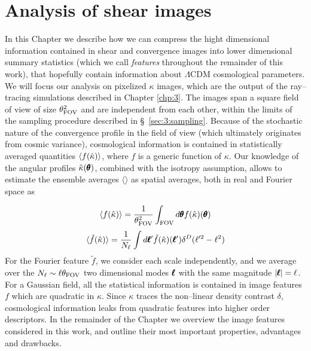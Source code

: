 
\chapter{Analysis of shear images}
\lhead[\fancyplain{}{\thepage}]{\fancyplain{}{\rightmark}}
 \thispagestyle{plain}
\setlength{\parindent}{10mm}

In this Chapter we describe how we can compress the hight dimensional information contained in shear and convergence images into lower dimensional summary statistics (which we call \textit{features} throughout the remainder of this work), that hopefully contain information about $\Lambda$CDM cosmological parameters. We will focus our analysis on pixelized $\kappa$ images, which are the output of the ray--tracing simulations described in Chapter \ref{chp:3}. The images span a square field of view of size $\theta_{\rm FOV}^2$ and are independent from each other, within the limits of the sampling procedure described in \S~\ref{sec:3:sampling}. Because of the stochastic nature of the convergence profile in the field of view (which ultimately originates from cosmic variance), cosmological information is contained in statistically averaged quantities $\langle f(\hat{\kappa})\rangle$, where $f$ is a generic function of $\kappa$. Our knowledge of the angular profiles $\hat{\kappa}(\pmb{\theta})$, combined with the isotropy assumption, allows to estimate the ensemble averages $\langle\rangle$ as spatial averages, both in real and Fourier space as 

\begin{equation}
\label{eq:4:average-real}
\langle f(\hat{\kappa})\rangle = \frac{1}{\theta^2_{\rm FOV}}\int_{\rm FOV}d\pmb{\theta} f(\hat{\kappa})(\pmb{\theta}) 
\end{equation}
%
\begin{equation}
\label{eq:4:average-fourier}
\langle \tilde{f}(\hat{\kappa})\rangle = \frac{1}{N_{\ell}}\int d\pmb{\ell}' \tilde{f}(\hat{\kappa})(\pmb{\ell}')\delta^D(\ell'^2-\ell^2)
\end{equation}  
%
For the Fourier feature $\tilde{f}$, we consider each scale independently, and we average over the $N_\ell\sim\ell\theta_{\rm FOV}$ two dimensional modes $\pmb{\ell}$ with the same magnitude $\vert\pmb{\ell}\vert=\ell$. For a Gaussian field, all the statistical information is contained in image features $f$ which are quadratic in $\kappa$. Since $\kappa$ traces the non--linear density contrast $\delta$, cosmological information leaks from quadratic features into higher order descriptors. In the remainder of the Chapter we overview the image features considered in this work, and outline their most important properties, advantages and drawbacks.   

